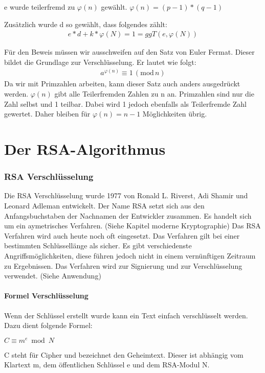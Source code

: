e wurde teilerfremd zu $ \varphi(n) $ gewählt. 
$ \varphi(n) = (p-1)*(q-1) $

Zusätzlich wurde d so gewählt, dass folgendes zählt:
\begin{align}
 e * d + k * \varphi(N) = 1 = ggT(e,\varphi(N))
\end{align}

Für den Beweis müssen wir ausschweifen auf den Satz von Euler Fermat. Dieser bildet die Grundlage 
zur Verschlüsselung. Er lautet wie folgt:
\begin{align}
	a^{\varphi(n)} \equiv 1\,(\mathrm{mod}\,n)
\end{align}
Da wir mit Primzahlen arbeiten, kann dieser Satz auch anders ausgedrückt werden. $ \varphi(n) $ gibt alle Teilerfremden Zahlen zu n an. Primzahlen 
sind nur die Zahl selbst und 1 teilbar. Dabei wird 1 jedoch ebenfalls als Teilerfremde Zahl gewertet. Daher bleiben für $ \varphi(n) = n-1 $ Möglichkeiten übrig.
\part{Der RSA-Algorithmus}



\section{RSA Verschlüsselung}
Die RSA Verschlüsselung wurde 1977 von Ronald L. Riverst, Adi Shamir und Leonard Adleman entwickelt. Der Name RSA setzt sich aus den Anfangsbuchstaben der Nachnamen der Entwickler zusammen. Es handelt sich um ein aymetrisches Verfahren. (Siehe Kapitel moderne Kryptographie) %
Das RSA Verfahren wird auch heute noch oft eingesetzt. Das Verfahren gilt bei einer bestimmten Schlüssellänge als sicher. Es gibt verschiedenste Angriffsmöglichkeiten, diese führen jedoch nicht in einem vernünftigen Zeitraum zu Ergebnissen. Das Verfahren wird zur Signierung und zur Verschlüsselung verwendet. (Siehe Anwendung) %

\subsection{Formel Verschlüsselung}
Wenn der Schlüssel erstellt wurde kann ein Text einfach verschlüsselt werden. Dazu dient folgende Formel:

$ C \equiv m^e  \bmod N $

C steht für Cipher und bezeichnet den Geheimtext. Dieser ist abhängig vom Klartext m, dem öffentlichen Schlüssel e und dem RSA-Modul N. 

